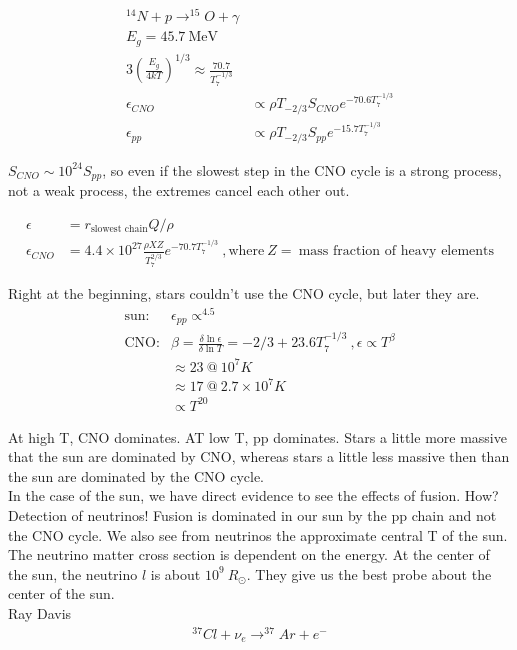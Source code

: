 \documentclass[10pt,a4paper]{article}
\begin{document}
\begin{align}
^{14}N + p \rightarrow  ^{15}O + \gamma \\
E_g = 45.7 ~\text{MeV}\\
3 \left( \frac{E_g}{4kT}\right)^{1/3} \approx \frac{70.7}{T_7^{-1/3}}\\
\epsilon_{CNO} & \propto \rho T_{-2/3} S_{CNO} e^{-70.6 T_7^{-1/3}}\\
\epsilon_{pp}& \propto \rho T_{-2/3} S_{pp}e^{-15.7 T_7^{-1/3}}
\end{align}

$S_{CNO} \sim 10^{24} S_{pp}$, so even if the slowest step in the CNO cycle is a strong process, not a weak process, the extremes cancel each other out. 

\begin{align}
\epsilon &= r_{\text{slowest chain}} Q/\rho\\
\epsilon_{CNO} &= 4.4 \times 10^{27} \frac{\rho XZ}{T_7^{2/3}} e^{-70.7 T_7 ^{-1/3}}~,\text{where}~ Z = ~\text{mass fraction of heavy elements}
\end{align}

Right at the beginning, stars couldn't use the CNO cycle, but later they are. \\

\begin{align}
\text{sun:} &\epsilon_{pp} \propto ^{4.5}\\
\text{CNO:} &\beta = \frac{\delta \ln \epsilon}{\delta \ln T} = -2/3 + 23.6 T_7^{-1/3}~, \epsilon \propto T^\beta\\
& \approx 23~ @~ 10^7 K\\
& \approx 17~@~ 2.7 \times 10^7K\\
& \propto T^{20}
\end{align}

At high T, CNO dominates. AT low T, pp dominates. Stars a little more massive that the sun are dominated by CNO, whereas stars a little less massive then than the sun are dominated by the CNO cycle. \\

In the case of the sun, we have direct evidence to see the effects of fusion. How? Detection of neutrinos! Fusion is dominated in our sun by the pp chain and not the CNO cycle. We also see from neutrinos the approximate central T of the sun. \\

The neutrino matter cross section is dependent on the energy. At the center of the sun, the neutrino $l$ is about $10^9~R_\odot$. They give us the best probe about the center of the sun. \\

Ray Davis
\begin{align}
^{37}Cl + \nu_e \rightarrow ^{37}Ar + e^-
\end{align}
\end{document}
